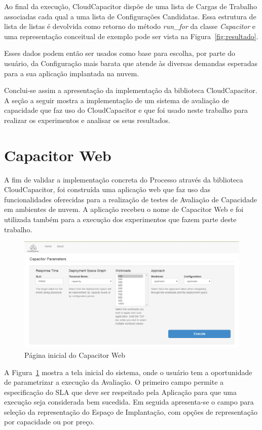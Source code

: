 Ao final da execução, CloudCapacitor dispõe de uma lista de Cargas de Trabalho 
associadas cada qual a uma lista de Configurações Candidatas. Essa estrutura de
lista de listas é devolvida como retorno do método \emph{run\_for} da classe 
\emph{Capacitor} e uma representação conceitual de exemplo pode ser vista na 
Figura~\ref{fig:resultado}. 

Esses dados podem então ser usados como base para escolha, por parte do usuário,
da Configuração mais barata que atende às diversas demandas esperadas para a 
sua aplicação implantada na nuvem.

Conclui-se assim a apresentação da implementação da biblioteca CloudCapacitor. A
seção a seguir mostra a implementação de um sistema de avaliação de capacidade 
que faz uso do CloudCapacitor e que foi usado neste trabalho para realizar os
experimentos e analisar os seus resultados.

\section{Capacitor Web}
A fim de validar a implementação concreta do Processo através da biblioteca
CloudCapacitor, foi construída uma aplicação web que faz uso das funcionalidades
oferecidas para a realização de testes de Avaliação de Capacidade em ambientes
de nuvem. A aplicação recebeu o nome de Capacitor Web e foi utilizada também
para a execução dos experimentos que fazem parte deste trabalho.

\begin{figure}[htb]
  \caption{\label{fig:capacitor_web_front}Página inicial do Capacitor Web}
  \begin{center}
    \includegraphics[scale=0.5]{img/CapacitorWeb_Frontpage}
  \end{center}
\end{figure}

A Figura~\ref{fig:capacitor_web_front} mostra a tela inicial do sistema, onde
o usuário tem a oportunidade de parametrizar a execução da Avaliação. O primeiro
campo permite a especificação do SLA que deve ser respeitado pela Aplicação para
que uma execução seja considerada bem sucedida. Em seguida apresenta-se o campo
para seleção da representação do Espaço de Implantação, com opções de representação
por capacidade ou por preço.

